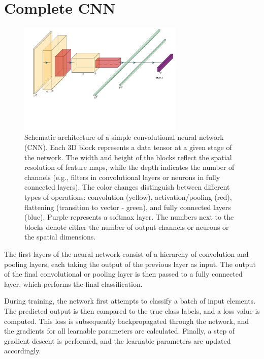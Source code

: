 \documentclass{pracalicmgr}
\begin{document}
\section{Complete CNN}

\begin{figure}[H]
    \centering
    \includegraphics[width=0.7\textwidth]{src/lenet.pdf}
    \caption{Schematic architecture of a simple convolutional neural network (CNN). Each 3D block represents a data tensor at a given stage of the network. The width and height of the blocks reflect the spatial resolution of feature maps, while the depth indicates the number of channels (e.g., filters in convolutional layers or neurons in fully connected layers). The color changes distinguish between different types of operations: convolution (yellow), activation/pooling (red), flattening (transition to vector - green), and fully connected layers (blue). Purple represents a softmax layer. The numbers next to the blocks denote either the number of output channels or neurons or the spatial dimensions\cite{Iqbal2018PlotNeuralNet}.}
    \label{fig:cnn_architecture}
\end{figure}

The first layers of the neural network consist of a hierarchy of convolution and pooling layers, each taking the output of the previous layer as input. The output of the final convolutional or pooling layer is then passed to a fully connected layer, which performs the final classification.

During training, the network first attempts to classify a batch of input elements. The predicted output is then compared to the true class labels, and a loss value is computed. This loss is subsequently backpropagated through the network, and the gradients for all learnable parameters are calculated. Finally, a step of gradient descent is performed, and the learnable parameters are updated accordingly.
\end{document}
